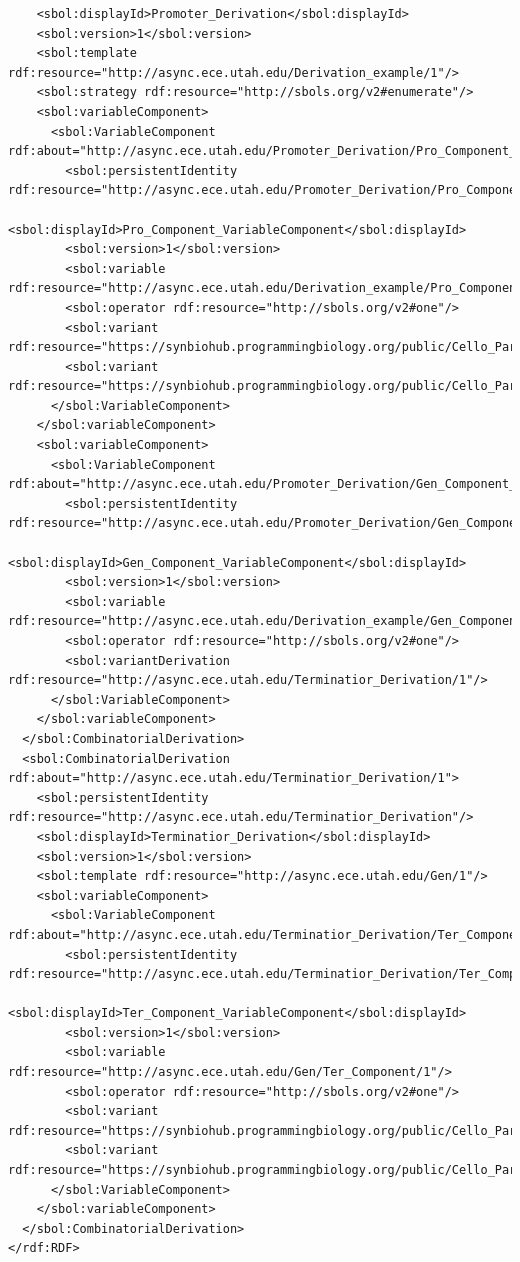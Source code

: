 \begin{lstlisting}
    <sbol:displayId>Promoter_Derivation</sbol:displayId>
    <sbol:version>1</sbol:version>
    <sbol:template rdf:resource="http://async.ece.utah.edu/Derivation_example/1"/>
    <sbol:strategy rdf:resource="http://sbols.org/v2#enumerate"/>
    <sbol:variableComponent>
      <sbol:VariableComponent rdf:about="http://async.ece.utah.edu/Promoter_Derivation/Pro_Component_VariableComponent/1">
        <sbol:persistentIdentity rdf:resource="http://async.ece.utah.edu/Promoter_Derivation/Pro_Component_VariableComponent"/>
        <sbol:displayId>Pro_Component_VariableComponent</sbol:displayId>
        <sbol:version>1</sbol:version>
        <sbol:variable rdf:resource="http://async.ece.utah.edu/Derivation_example/Pro_Component/1"/>
        <sbol:operator rdf:resource="http://sbols.org/v2#one"/>
        <sbol:variant rdf:resource="https://synbiohub.programmingbiology.org/public/Cello_Parts/pBetI/1"/>
        <sbol:variant rdf:resource="https://synbiohub.programmingbiology.org/public/Cello_Parts/pAmtR/1"/>
      </sbol:VariableComponent>
    </sbol:variableComponent>
    <sbol:variableComponent>
      <sbol:VariableComponent rdf:about="http://async.ece.utah.edu/Promoter_Derivation/Gen_Component_VariableComponent/1">
        <sbol:persistentIdentity rdf:resource="http://async.ece.utah.edu/Promoter_Derivation/Gen_Component_VariableComponent"/>
        <sbol:displayId>Gen_Component_VariableComponent</sbol:displayId>
        <sbol:version>1</sbol:version>
        <sbol:variable rdf:resource="http://async.ece.utah.edu/Derivation_example/Gen_Component/1"/>
        <sbol:operator rdf:resource="http://sbols.org/v2#one"/>
        <sbol:variantDerivation rdf:resource="http://async.ece.utah.edu/Terminatior_Derivation/1"/>
      </sbol:VariableComponent>
    </sbol:variableComponent>
  </sbol:CombinatorialDerivation>
  <sbol:CombinatorialDerivation rdf:about="http://async.ece.utah.edu/Terminatior_Derivation/1">
    <sbol:persistentIdentity rdf:resource="http://async.ece.utah.edu/Terminatior_Derivation"/>
    <sbol:displayId>Terminatior_Derivation</sbol:displayId>
    <sbol:version>1</sbol:version>
    <sbol:template rdf:resource="http://async.ece.utah.edu/Gen/1"/>
    <sbol:variableComponent>
      <sbol:VariableComponent rdf:about="http://async.ece.utah.edu/Terminatior_Derivation/Ter_Component_VariableComponent/1">
        <sbol:persistentIdentity rdf:resource="http://async.ece.utah.edu/Terminatior_Derivation/Ter_Component_VariableComponent"/>
        <sbol:displayId>Ter_Component_VariableComponent</sbol:displayId>
        <sbol:version>1</sbol:version>
        <sbol:variable rdf:resource="http://async.ece.utah.edu/Gen/Ter_Component/1"/>
        <sbol:operator rdf:resource="http://sbols.org/v2#one"/>
        <sbol:variant rdf:resource="https://synbiohub.programmingbiology.org/public/Cello_Parts/L3S3P31/1"/>
        <sbol:variant rdf:resource="https://synbiohub.programmingbiology.org/public/Cello_Parts/L3S2P55/1"/>
      </sbol:VariableComponent>
    </sbol:variableComponent>
  </sbol:CombinatorialDerivation>
</rdf:RDF>
\end{lstlisting}


